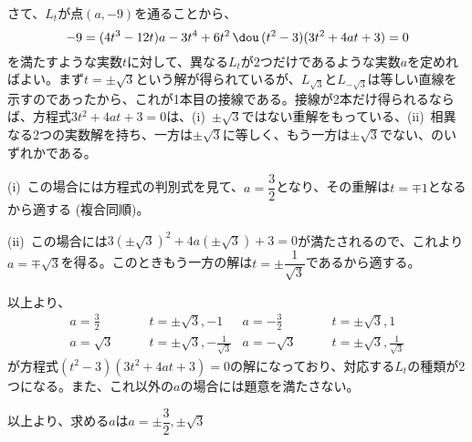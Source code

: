 さて、$L_t$が点$(a, -9)$を通ることから、
\[ -9=(4t^3-12t)a-3t^4+6t^2 \,\dou\, (t^2-3)(3t^2+4at+3)=0 \]
を満たすような実数$t$に対して、異なる$L_t$が2つだけであるような実数$a$を定めればよい。まず$t=\pm\sqrt{3}$という解が得られているが、$L_{\sqrt{3}}$と$L_{-\sqrt{3}}$は等しい直線を示すのであったから、これが1本目の接線である。接線が2本だけ得られるならば、方程式$3t^2+4at+3=0$は、(i)~$\pm\sqrt{3}$ではない重解をもっている、(ii)~相異なる2つの実数解を持ち、一方は$\pm\sqrt{3}$に等しく、もう一方は$\pm\sqrt{3}$でない、のいずれかである。

(i)~この場合には方程式の判別式を見て、$a=\dfrac{3}{2}$となり、その重解は$t=\mp 1$となるから適する (複合同順)。

(ii)~この場合には$3(\pm\sqrt{3})^2+4a(\pm\sqrt{3})+3=0$が満たされるので、これより$a=\mp\sqrt{3}$を得る。このときもう一方の解は$t=\pm\dfrac{1}{\sqrt{3}}$であるから適する。

以上より、
\begin{align*}
 a=\frac{3}{2}\quad&\text{}\quad t=\pm\sqrt{3}, -1 & a=-\frac{3}{2}\quad&\text{}\quad t=\pm\sqrt{3}, 1 \\
 a=\sqrt{3}\quad&\text{}\quad t=\pm\sqrt{3}, -\frac{1}{\sqrt{3}} & a=-\sqrt{3}\quad&\text{}\quad t=\pm\sqrt{3}, \frac{1}{\sqrt{3}}
\end{align*}
が方程式$(t^2-3)(3t^2+4at+3)=0$の解になっており、対応する$L_t$の種類が2つになる。また、これ以外の$a$の場合には題意を満たさない。

以上より、求める$a$は$a=\pm\dfrac{3}{2}, \pm\sqrt{3}$